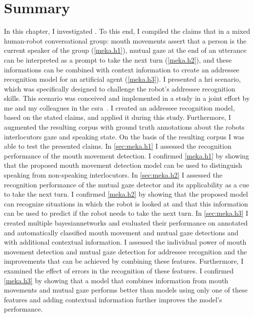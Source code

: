 \section{Summary}
In this chapter, I investigated .
To this end, I compiled the claims that in a mixed human-\gls{robot} \gls{conversational group}:
mouth movements assert that a person is the current \gls{speaker} of the group (\cref{meka.h1}), 
mutual gaze at the end of an utterance can be interpreted as a prompt to take the next \gls{turn} (\cref{meka.h2}), and 
these informations can be combined with context information to create an \gls{addressee} recognition model for an \gls{artificial agent} (\cref{meka.h3}).
I presented a \gls{hri} scenario, which was specifically designed to challenge the \gls{robot}'s \gls{addressee} recognition skills.
This scenario was conceived and implemented in a study in a joint effort by me and my colleagues in the \gls{csra}~\cite{Richter}.
I created an \gls{addressee} recognition model, based on the stated claims, and applied it during this study.
Furthermore, I augmented the resulting corpus with ground truth annotations about the \glspl{robot} interlocutors gaze and speaking state.
On the basis of the resulting corpus I was able to test the presented claims.
In \cref{sec:meka.h1} I assessed the recognition performance of the mouth movement detection.
I confirmed \cref{meka.h1} by showing that the proposed mouth movement detection model can be used to distinguish speaking from non-speaking interlocutors.
In \cref{sec:meka.h2} I assessed the recognition performance of the mutual gaze detector and its applicability as a cue to take the next \gls{turn}.
I confirmed \cref{meka.h2} by showing that the proposed model can recognize situations in which the \gls{robot} is looked at and that this information can be used to predict if the \gls{robot} needs to take the next \gls{turn}. 
In \cref{sec:meka.h3} I created multiple \glspl{bayesiannetwork} and evaluated their performance on annotated and automatically classified mouth movement and mutual gaze detections and with additional contextual information.
I assessed the individual power of mouth movement detection and mutual gaze detection for \gls{addressee} recognition and the improvements that can be achieved by combining these features.
Furthermore, I examined the effect of errors in the recognition of these features.
I confirmed \cref{meka.h3} by showing that a model that combines information from mouth movements and mutual gaze performs better than models using only one of these features and adding contextual information further improves the model's performance.

